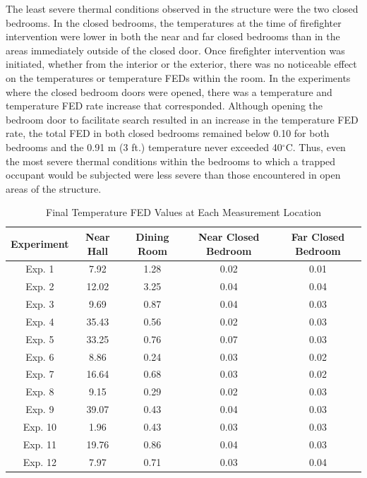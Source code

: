 \documentclass[12pt,oneside]{article}
\begin{document}
The least severe thermal conditions observed in the structure were the two closed bedrooms. In the closed bedrooms, the temperatures at the time of firefighter intervention were lower in both the near and far closed bedrooms than in the areas immediately outside of the closed door. Once firefighter intervention was initiated, whether from the interior or the exterior, there was no noticeable effect on the temperatures or temperature FEDs within the room. In the experiments where the closed bedroom doors were opened, there was a temperature and temperature FED rate increase that corresponded. Although opening the bedroom door to facilitate search resulted in an increase in the temperature FED rate, the total FED in both closed bedrooms remained below 0.10 for both bedrooms and the 0.91 m (3 ft.) temperature never exceeded 40$^{\circ}$C. Thus, even the most severe thermal conditions within the bedrooms to which a trapped occupant would be subjected were less severe than those encountered in open areas of the structure. 

\begin{table}[!ht]
    \centering
    \caption{Final Temperature FED Values at Each Measurement Location}
    \label{tab:temp_fed}
    \begin{tabular}{ccccc}
    \toprule[1.5pt]
	\textbf{Experiment}  &   \textbf{Near Hall}& \textbf{Dining Room}& \textbf{Near Closed Bedroom}& \textbf{Far Closed Bedroom} \\ 
	\midrule                                                                   
	Exp. 1 &7.92        & 1.28        		& 0.02     & 0.01        \\  
	Exp. 2 &12.02       & 3.25       		& 0.04     & 0.04        \\
	Exp. 3 & 9.69    	& 0.87        		& 0.04     & 0.03        \\               
	Exp. 4 & 35.43      & 0.56         		& 0.02     & 0.03        \\                
	Exp. 5 & 33.25      & 0.76          	& 0.07     & 0.03        \\                 
	Exp. 6 & 8.86       & 0.24         		& 0.03     & 0.02        \\                 
	Exp. 7 & 16.64      & 0.68         		& 0.03     & 0.02        \\                
	Exp. 8 & 9.15       & 0.29         		& 0.02     & 0.03        \\            
	Exp. 9 & 39.07      & 0.43          	& 0.04     & 0.03        \\              
	Exp. 10& 1.96       & 0.43          	& 0.03     & 0.03        \\         
	Exp. 11& 19.76      & 0.86           	& 0.04     & 0.03        \\             
	Exp. 12& 7.97       & 0.71          	& 0.03     & 0.04        \\           
	\bottomrule[1.25pt] 

    \end{tabular}
\end{table}                   
\end{document}

